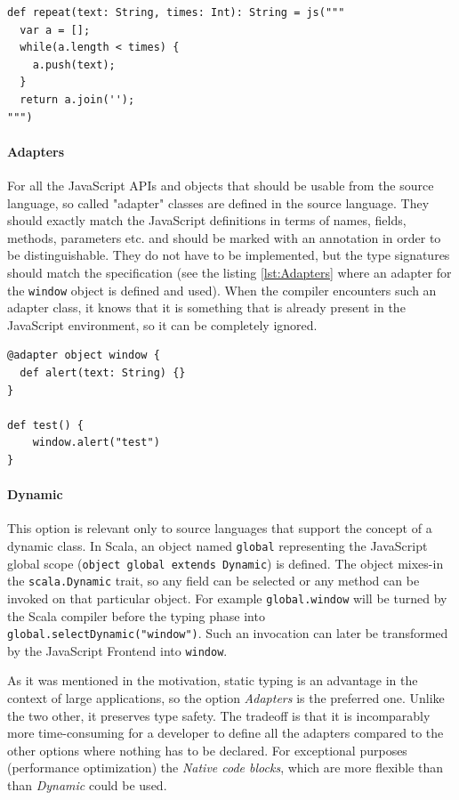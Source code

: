 \documentclass[12pt,a4paper]{report}
\begin{document}
\begin{lstlisting}[caption={Native code block example.},label={lst:NativeCodeBlock}]
def repeat(text: String, times: Int): String = js("""
  var a = [];
  while(a.length < times) {
    a.push(text);
  }
  return a.join('');
""")
\end{lstlisting}

\paragraph{Adapters} For all the JavaScript APIs and objects that should be usable from the source language, so called "adapter" classes are defined in the source language. They should exactly match the JavaScript definitions in terms of names, fields, methods, parameters etc. and should be marked with an annotation in order to be distinguishable. They do not have to be implemented, but the type signatures should match the specification (see the listing \ref{lst:Adapters} where an adapter for the \texttt{window} object is defined and used). When the compiler encounters such an adapter class, it knows that it is something that is already present in the JavaScript environment, so it can be completely ignored.

\begin{lstlisting}[caption={Adapter definition and usage example.},label={lst:Adapters}]
@adapter object window {
  def alert(text: String) {}
}

def test() {
	window.alert("test")
}
\end{lstlisting}

\paragraph{Dynamic} This option is relevant only to source languages that support the concept of a dynamic class. In Scala, an object named \texttt{global} representing the JavaScript global scope (\texttt{object global extends Dynamic}) is defined. The object mixes-in the \texttt{scala.Dynamic}\cite{ScalaDynamic} trait, so any field can be selected or any method can be invoked on that particular object. For example \texttt{global.window} will be turned by the Scala compiler before the typing phase into \texttt{global.selectDynamic("window")}. Such an invocation can later be transformed by the JavaScript Frontend into \texttt{window}.

As it was mentioned in the motivation, static typing is an advantage in the context of large applications, so the option {\it Adapters} is the preferred one. Unlike the two other, it preserves type safety. The tradeoff is that it is incomparably more time-consuming for a developer to define all the adapters compared to the other options where nothing has to be declared. For exceptional purposes (performance optimization) the {\it Native code blocks}, which are more flexible than than {\it Dynamic} could be used.
\end{document}
